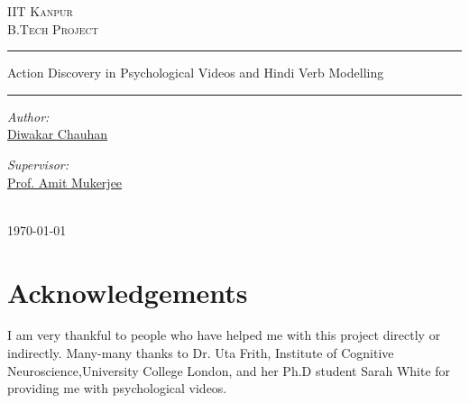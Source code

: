 \def\DevnagVersion{2.15}\documentclass[a4paper, 10pt, notitlepage]{report}
\author{Diwakar Chauhan} %
\date{\today} %
\begin{document}
\begin{center}

{\color{blue}  \textsc{\LARGE IIT Kanpur}\\[1.5cm] }
\textsc{\Large B.Tech Project}\\[1cm]
\hrule height 2pt
\vspace*{10pt}
{\huge  Action Discovery in Psychological Videos and Hindi Verb Modelling}\\[0.4cm] 
\hrule height 2pt 
\vspace*{10pt}
\begin{minipage}{0.4\textwidth}
\begin{flushleft} \large
\emph{Author:}\\
{\color{blue} \href{http://home.iitk.ac.in/~diwakarc}{Diwakar Chauhan} }
\end{flushleft}
\end{minipage}
\begin{minipage}{0.4\textwidth}
\begin{flushright} \large
\emph{Supervisor:} \\
{\color{blue} \href{http://www.cse.iitk.ac.in/users/amit}{Prof. Amit Mukerjee } }%
\end{flushright}
\end{minipage}\\[3cm]


{\large \today}\\[4cm] %
\end{center}

\thispagestyle{empty}

\newpage
\section*{Acknowledgements} %
I am very thankful to people who have helped me with this project directly or indirectly.
Many-many thanks to Dr. Uta Frith, Institute of Cognitive Neuroscience,University College London, and  her Ph.D student Sarah White for providing me with psychological videos.\\%
\end{document}

